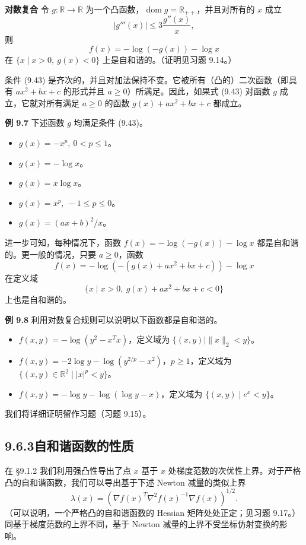 \documentclass[UTF8, 12pt, fontset=fandol, oneside]{ctexart}
\begin{document}
\noindent\textbf{对数复合}\quad
令 $g:\mathbb{R}\to\mathbb{R}$ 为一个凸函数，$\operatorname{dom} g=\mathbb{R}_{++}$，并且对所有的 $x$ 成立
\begin{equation}
|g'''(x)|\leq 3\frac{g''(x)}{x},
\tag{9.43}
\end{equation}
则
\[
f(x)=-\log(-g(x))-\log x
\]
在 $\{x\mid x>0,\ g(x)<0\}$ 上是自和谐的。（证明见习题 9.14。）

条件 (9.43) 是齐次的，并且对加法保持不变。它被所有（凸的）二次函数（即具有 $ax^2+bx+c$ 的形式并且 $a\geq0$）所满足。因此，如果式 (9.43) 对函数 $g$ 成立，它就对所有满足 $a\geq0$ 的函数 $g(x)+ax^2+bx+c$ 都成立。

\noindent\textbf{例 9.7}\quad
下述函数 $g$ 均满足条件 (9.43)。
\begin{itemize}
\item $g(x)=-x^p,\ 0<p\leq1$。
\item $g(x)=-\log x$。
\item $g(x)=x\log x$。
\item $g(x)=x^p,\ -1\leq p\leq0$。
\item $g(x)=(ax+b)^2/x$。
\end{itemize}
进一步可知，每种情况下，函数 $f(x)=-\log(-g(x))-\log x$ 都是自和谐的。更一般的情况，只要 $a\geq0$，函数
\[
f(x)=-\log(-(g(x)+ax^2+bx+c))-\log x
\]
在定义域
\[
\{x\mid x>0,\ g(x)+ax^2+bx+c<0\}
\]
上也是自和谐的。

\noindent\textbf{例 9.8}\quad
利用对数复合规则可以说明以下函数都是自和谐的。
\begin{itemize}
\item $f(x,y)=-\log(y^2-x^Tx)$，定义域为 $\{(x,y)\mid \|x\|_2<y\}$。
\item $f(x,y)=-2\log y-\log(y^{2/p}-x^2)$，$p\geq1$，定义域为 $\{(x,y)\in\mathbb{R}^2\mid |x|^p<y\}$。
\item $f(x,y)=-\log y-\log(\log y-x)$，定义域为 $\{(x,y)\mid e^x<y\}$。
\end{itemize}
我们将详细证明留作习题（习题 9.15）。

\subsection*{9.6.3\quad 自和谐函数的性质}

在 \S9.1.2 我们利用强凸性导出了点 $x$ 基于 $x$ 处梯度范数的次优性上界。对于严格凸的自和谐函数，我们可以导出基于下述 Newton 减量的类似上界
\[
\lambda(x)=\left(\nabla f(x)^T\nabla^2 f(x)^{-1}\nabla f(x)\right)^{1/2}.
\]
（可以说明，一个严格凸的自和谐函数的 Hessian 矩阵处处正定；见习题 9.17。）同基于梯度范数的上界不同，基于 Newton 减量的上界不受坐标仿射变换的影响。
\end{document}
